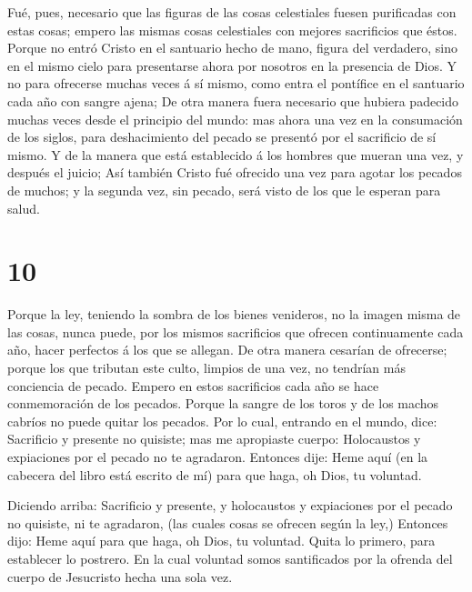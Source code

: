  Fué, pues, necesario que las figuras de las cosas
celestiales fuesen purificadas con estas cosas; empero las mismas cosas
celestiales con mejores sacrificios que éstos.  Porque no
entró Cristo en el santuario hecho de mano, figura del verdadero, sino
en el mismo cielo para presentarse ahora por nosotros en la presencia de
Dios.  Y no para ofrecerse muchas veces á sí mismo, como
entra el pontífice en el santuario cada año con sangre ajena;
 De otra manera fuera necesario que hubiera padecido muchas
veces desde el principio del mundo: mas ahora una vez en la consumación
de los siglos, para deshacimiento del pecado se presentó por el
sacrificio de sí mismo.  Y de la manera que está
establecido á los hombres que mueran una vez, y después el juicio;
 Así también Cristo fué ofrecido una vez para agotar los
pecados de muchos; y la segunda vez, sin pecado, será visto de los que
le esperan para salud.

\hypertarget{section-9}{%
\section{10}\label{section-9}}

 Porque la ley, teniendo la sombra de los bienes venideros,
no la imagen misma de las cosas, nunca puede, por los mismos sacrificios
que ofrecen continuamente cada año, hacer perfectos á los que se
allegan.  De otra manera cesarían de ofrecerse; porque los
que tributan este culto, limpios de una vez, no tendrían más conciencia
de pecado.  Empero en estos sacrificios cada año se hace
conmemoración de los pecados.  Porque la sangre de los toros
y de los machos cabríos no puede quitar los pecados.  Por lo
cual, entrando en el mundo, dice: Sacrificio y presente no quisiste; mas
me apropiaste cuerpo:  Holocaustos y expiaciones por el
pecado no te agradaron.  Entonces dije: Heme aquí (en la
cabecera del libro está escrito de mí) para que haga, oh Dios, tu
voluntad.

 Diciendo arriba: Sacrificio y presente, y holocaustos y
expiaciones por el pecado no quisiste, ni te agradaron, (las cuales
cosas se ofrecen según la ley,)  Entonces dijo: Heme aquí
para que haga, oh Dios, tu voluntad. Quita lo primero, para establecer
lo postrero.  En la cual voluntad somos santificados por la
ofrenda del cuerpo de Jesucristo hecha una sola vez.

